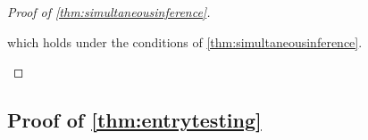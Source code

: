 \documentclass[10pt]{article}
\newcommand{\0}{{\mathbf{0}}}
\newcommand{\1}{{\mathbf{1}}}
\begin{document}
\begin{proof}[Proof of \cref{thm:simultaneousinference}]
\begin{itemize}
 which holds under the conditions of \cref{thm:simultaneousinference}.  
 \end{itemize}
\end{proof}

\subsection{Proof of \cref{thm:entrytesting}}
\end{document}
